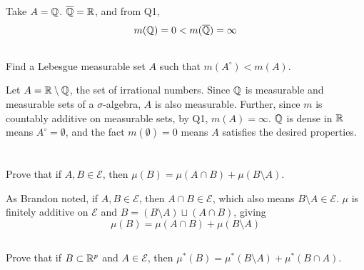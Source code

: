 \documentclass[12pt]{article}
\begin{document}
\noindent\dotfill 

Take $A = \mathbb{Q}$. 
$\overline{\mathbb{Q}} = \mathbb{R}$, and from Q1, 
$$m(\mathbb{Q}) = 0 < m(\overline{\mathbb{Q}}) = \infty$$

\subsection{} 
Find a Lebesgue measurable set $A$ such that $m(A^{\circ}) < m(A)$. 

\noindent \dotfill 

Let $A = \mathbb{R} \setminus \mathbb{Q}$, the set of irrational numbers.  
Since $\mathbb{Q}$ is measurable and measurable sets of a $\sigma$-algebra, $A$ is also measurable. 
Further, since $m$ is countably additive on measurable sets, by Q1, $m(A) = \infty$. 
$\mathbb{Q}$ is dense in $\mathbb{R}$ means $A^{\circ} = \emptyset$, and the fact $m(\emptyset) = 0$ means $A$ satisfies the desired properties. 

\section{} 
\subsection{} 
Prove that if $A, B \in \mathscr{E}$, then $\mu(B) = \mu(A \cap B) + \mu(B \setminus A)$. 

\noindent \dotfill 

As Brandon noted, if $A, B \in \mathscr{E}$, then $A \cap B \in \mathscr{E}$, which also means $B \setminus A \in \mathscr{E}$. 
$\mu$ is finitely additive on $\mathscr{E}$ and $B = (B \setminus A) \sqcup (A \cap B)$, giving 
$$\mu(B) = \mu(A \cap B) + \mu(B \setminus A)$$

\subsection{} 
Prove that if $B \subset \mathbb{R}^{p}$ and $A \in \mathscr{E}$, then $\mu^{*}(B) = \mu^{*} (B \setminus A) + \mu^{*} (B \cap A)$. 

\noindent \dotfill 
\end{document}
